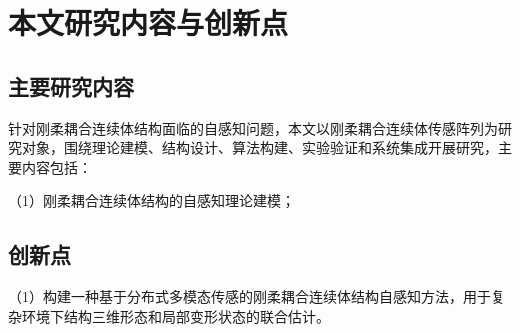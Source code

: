 \section{本文研究内容与创新点}
\subsection{主要研究内容}
针对刚柔耦合连续体结构面临的自感知问题，本文以刚柔耦合连续体传感阵列为研究对象，围绕理论建模、结构设计、算法构建、实验验证和系统集成开展研究，主要内容包括：

（1）刚柔耦合连续体结构的自感知理论建模；
\subsection{创新点}
（1）构建一种基于分布式多模态传感的刚柔耦合连续体结构自感知方法，用于复杂环境下结构三维形态和局部变形状态的联合估计。
